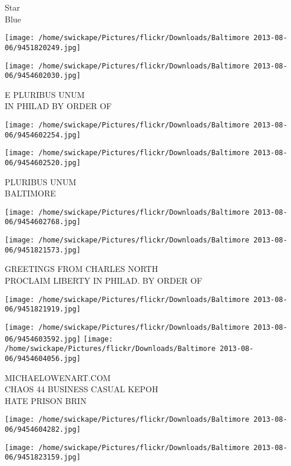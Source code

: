 \documentclass[10pt,letterpaper]{article}
\begin{document}
Star\\
Blue
\pagebreak

\texttt{[image: /home/swickape/Pictures/flickr/Downloads/Baltimore 2013-08-06/9451820249.jpg]}

\vspace{0.25in}
\texttt{[image: /home/swickape/Pictures/flickr/Downloads/Baltimore 2013-08-06/9454602030.jpg]}

E PLURIBUS UNUM\\
IN PHILAD BY ORDER OF
\pagebreak

\texttt{[image: /home/swickape/Pictures/flickr/Downloads/Baltimore 2013-08-06/9454602254.jpg]}

\vspace{0.25in}
\texttt{[image: /home/swickape/Pictures/flickr/Downloads/Baltimore 2013-08-06/9454602520.jpg]}

PLURIBUS UNUM\\
BALTIMORE
\pagebreak

\texttt{[image: /home/swickape/Pictures/flickr/Downloads/Baltimore 2013-08-06/9454602768.jpg]}

\vspace{0.25in}
\texttt{[image: /home/swickape/Pictures/flickr/Downloads/Baltimore 2013-08-06/9451821573.jpg]}

GREETINGS FROM CHARLES NORTH\\
PROCLAIM LIBERTY IN PHILAD. BY ORDER OF
\pagebreak

\texttt{[image: /home/swickape/Pictures/flickr/Downloads/Baltimore 2013-08-06/9451821919.jpg]}

\vspace{0.25in}
\texttt{[image: /home/swickape/Pictures/flickr/Downloads/Baltimore 2013-08-06/9454603592.jpg]}
\texttt{[image: /home/swickape/Pictures/flickr/Downloads/Baltimore 2013-08-06/9454604056.jpg]}

MICHAELOWENART.COM\\
CHAOS 44 BUSINESS CASUAL KEPOH\\
HATE PRISON BRIN
\pagebreak

\texttt{[image: /home/swickape/Pictures/flickr/Downloads/Baltimore 2013-08-06/9454604282.jpg]}

\vspace{0.25in}
\texttt{[image: /home/swickape/Pictures/flickr/Downloads/Baltimore 2013-08-06/9451823159.jpg]}
\end{document}
